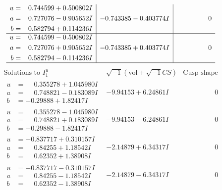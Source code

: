 \documentclass[1p]{elsarticle_modified}
\theoremstyle{definition}
\newcommand{\I}{\sqrt{-1}}
\begin{document}
$$\begin{array}{c|c|c}
\begin{aligned}
u &= \phantom{-}0.744599 + 0.500802 I \\
a &= \phantom{-}0.727076 - 0.905652 I \\
b &= \phantom{-}0.582794 + 0.114236 I\end{aligned}
 & -0.743385 - 0.403774 I & \phantom{-0.000000 } 0 \\ \hline\begin{aligned}
u &= \phantom{-}0.744599 - 0.500802 I \\
a &= \phantom{-}0.727076 + 0.905652 I \\
b &= \phantom{-}0.582794 - 0.114236 I\end{aligned}
 & -0.743385 + 0.403774 I & \phantom{-0.000000 } 0\\
 \hline 
 \end{array}$$\newpage$$\begin{array}{c|c|c}  
\text{Solutions to }I^u_{1}& \I (\text{vol} + \sqrt{-1}CS) & \text{Cusp shape}\\
 \hline 
\begin{aligned}
u &= \phantom{-}0.355278 + 1.045980 I \\
a &= \phantom{-}0.748821 - 0.183089 I \\
b &= -0.29888 + 1.82417 I\end{aligned}
 & -9.94153 + 6.24861 I & \phantom{-0.000000 } 0 \\ \hline\begin{aligned}
u &= \phantom{-}0.355278 - 1.045980 I \\
a &= \phantom{-}0.748821 + 0.183089 I \\
b &= -0.29888 - 1.82417 I\end{aligned}
 & -9.94153 - 6.24861 I & \phantom{-0.000000 } 0 \\ \hline\begin{aligned}
u &= -0.837717 + 0.310157 I \\
a &= \phantom{-}0.84255 + 1.18542 I \\
b &= \phantom{-}0.62352 + 1.38908 I\end{aligned}
 & -2.14879 + 6.34317 I & \phantom{-0.000000 } 0 \\ \hline\begin{aligned}
u &= -0.837717 - 0.310157 I \\
a &= \phantom{-}0.84255 - 1.18542 I \\
b &= \phantom{-}0.62352 - 1.38908 I\end{aligned}
 & -2.14879 - 6.34317 I & \phantom{-0.000000 } 0 \\ \hline\begin{aligned}

\end{aligned}
\end{array}$$
\end{document}
